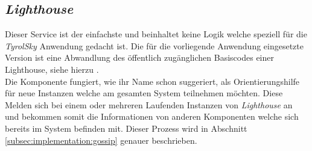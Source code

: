 \subsection{\textit{Lighthouse}}
\label{subsec:implementation:lighthouse}
Dieser Service ist der einfachste und beinhaltet keine Logik welche speziell für die \textit{TyrolSky} Anwendung gedacht ist. Die für die vorliegende Anwendung eingesetzte  Version ist eine Abwandlung des öffentlich zugänglichen Basiscodes einer Lighthouse, siehe hierzu \cite{lighthouse}. \\
Die Komponente fungiert, wie ihr Name schon suggeriert, als Orientierungshilfe für neue Instanzen welche am gesamten System teilnehmen möchten. Diese Melden sich bei einem oder mehreren Laufenden Instanzen von \textit{Lighthouse} an und bekommen somit die Informationen von anderen Komponenten welche sich bereits im System befinden mit. Dieser Prozess wird in Abschnitt \ref{subsec:implementation:gossip} genauer beschrieben.

